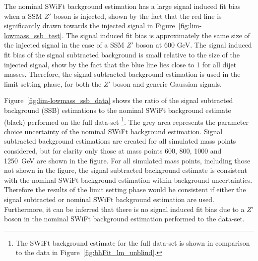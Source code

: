 The nominal SWiFt background estimation has a large signal induced fit bias when a SSM $Z'$ boson is injected,
shown by the fact that the red line is significantly drawn towards the injected signal in Figure~\ref{fig:lim-lowmass_ssb_test}.
The signal induced fit bias is approximately the same size of the injected signal in the case of a SSM $Z'$ boson at 600 GeV.
The signal induced fit bias of the signal subtracted background is small relative to the size of the injected signal,
show by the fact that the blue line lies close to 1 for all dijet masses.
Therefore, the signal subtracted background estimation is used in the limit setting phase, for both the $Z'$ boson and generic Gaussian signals.

Figure~\ref{fig:lim-lowmass_ssb_data} shows the ratio of the 
signal subtracted background (SSB) estimations to the nominal SWiFt background estimate (black) performed on the full \lm{} data-set
\footnote{The SWiFt background estimate for the full data-set is shown in comparison to the data in Figure~\ref{fig:bhFit_lm_unblind}.}.
The grey area represents the parameter choice uncertainty of the nominal SWiFt background estimation.
Signal subtracted background estimations are created for all simulated mass points considered,
but for clarity only those at mass points 600, 800, 1000 and 1250~GeV are shown in the figure.
For all simulated mass points, including those not shown in the figure,
the signal subtracted background estimate is consistent with the nominal SWiFt background estimation
within background uncertainties.
Therefore the results of the limit setting phase would be consistent if either the
signal subtracted or nominal SWiFt background estimation are used.
Furthermore, it can be inferred that there is no signal induced fit bias due to a $Z'$ boson
in the nominal SWiFt background estimation performed to the \lm{} data-set.

